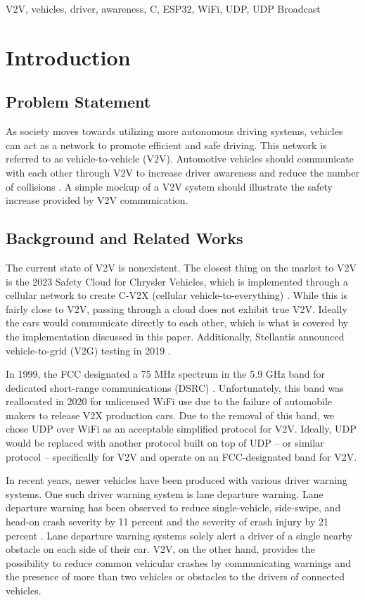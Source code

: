 \documentclass[conference]{IEEEtran}
\begin{document}
\begin{IEEEkeywords}
V2V, vehicles, driver, awareness, C, ESP32, WiFi, UDP, UDP Broadcast
\end{IEEEkeywords}

\section{Introduction}
\subsection{Problem Statement}
As society moves towards utilizing more autonomous driving systems, vehicles can
act as a network to promote efficient and safe driving. This network is referred
to as vehicle-to-vehicle (V2V). Automotive vehicles should communicate with each
other through V2V to increase driver awareness and reduce the number of
collisions \cite{nhtsa_v2v}. A simple mockup of a V2V system should illustrate the
safety increase provided by V2V communication.

\subsection{Background and Related Works}
The current state of V2V is nonexistent. The closest thing on the market to V2V
is the 2023 Safety Cloud for Chrysler Vehicles, which is implemented through a
cellular network to create C-V2X (cellular vehicle-to-everything)
\cite{stone_2023, haas}.  While this is fairly close to V2V, passing through a
cloud does not exhibit true V2V. Ideally the cars would communicate directly to
each other, which is what is covered by the implementation discussed in this
paper. Additionally, Stellantis announced vehicle-to-grid (V2G) testing in 2019
\cite{media.stellantis_2020}.

In 1999, the FCC designated a 75 MHz spectrum in the 5.9 GHz band for dedicated
short-range communications (DSRC) \cite{hawkins_2022}. Unfortunately, this band was
reallocated in 2020 for unlicensed WiFi \cite{hawkins_2022} use due to the
failure of automobile makers to release V2X production cars. Due to the removal
of this band, we chose UDP over WiFi as an acceptable simplified protocol for
V2V. Ideally, UDP would be replaced with another protocol built on top of UDP --
or similar protocol -- specifically for V2V and operate on an FCC-designated
band for V2V.

In recent years, newer vehicles have been produced with various driver warning systems.
One such driver warning system is lane departure warning. Lane departure warning has been
observed to reduce single-vehicle, side-swipe, and head-on crash severity by 11 percent
and the severity of crash injury by 21 percent \cite{iihs_bsd}. Lane departure warning
systems solely alert a driver of a single nearby obstacle on each side of their car.
V2V, on the other hand, provides the possibility to reduce common vehicular crashes by
communicating warnings and the presence of more than two vehicles or obstacles to the
drivers of connected vehicles.
\end{document}
